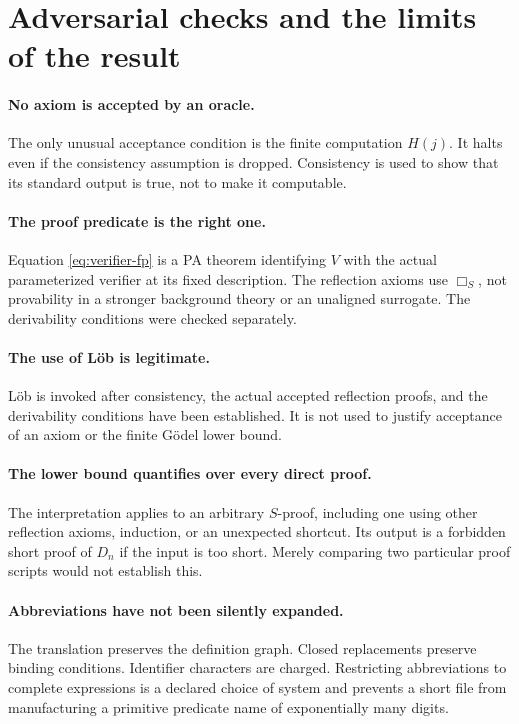 \documentclass[11pt]{article}
\theoremstyle{remark}
\begin{document}
\section{Adversarial checks and the limits of the result}

\paragraph{No axiom is accepted by an oracle.}
The only unusual acceptance condition is the finite computation $H(j)$.
It halts even if the consistency assumption is dropped. Consistency is used
to show that its standard output is true, not to make it computable.

\paragraph{The proof predicate is the right one.}
Equation \eqref{eq:verifier-fp} is a PA theorem identifying $V$ with the
actual parameterized verifier at its fixed description. The reflection
axioms use $\Box_S$, not provability in a stronger background theory or
an unaligned surrogate. The derivability conditions were checked separately.

\paragraph{The use of L\"ob is legitimate.}
L\"ob is invoked after consistency, the actual accepted reflection proofs,
and the derivability conditions have been established. It is not used to
justify acceptance of an axiom or the finite G\"odel lower bound.

\paragraph{The lower bound quantifies over every direct proof.}
The interpretation applies to an arbitrary $S$-proof, including one using
other reflection axioms, induction, or an unexpected shortcut. Its output
is a forbidden short proof of $D_n$ if the input is too short. Merely comparing
two particular proof scripts would not establish this.

\paragraph{Abbreviations have not been silently expanded.}
The translation preserves the definition graph. Closed replacements preserve
binding conditions. Identifier characters are charged. Restricting
abbreviations to complete expressions is a declared choice of system and
prevents a short file from manufacturing a primitive predicate name of
exponentially many digits.
\end{document}
